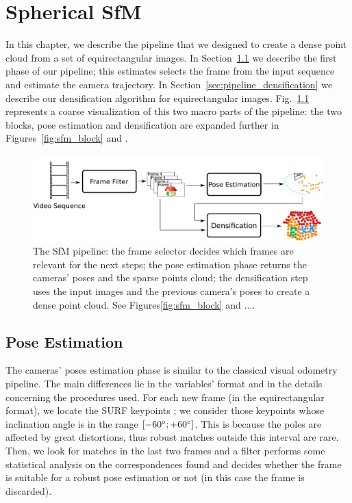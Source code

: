 \chapter{Spherical SfM}
In this chapter, we describe the pipeline that we designed to create a dense 
point cloud from a set of equirectangular images.
In Section~\ref{sec:pipeline_pose_estimation} we describe the first phase of our
pipeline; this estimates selects the frame from the input sequence and estimate
the camera trajectory. In Section~\ref{sec:pipeline_densification} we describe 
our densification algorithm for equirectangular images.
Fig.~\ref{fig:pipeline_overview}
represents a coarse visualization of this two macro parts of the 
pipeline: the two blocks, pose estimation and densification are 
expanded further in Figures~\ref{fig:sfm_block} and .

\begin{figure}
    \centering
    \includegraphics[width=0.8\linewidth]{img/pipeline_overview.pdf}
    \caption{The SfM pipeline: the frame selector decides which frames are 
    relevant for the next steps; the pose estimation phase returns the cameras' 
    poses and the sparse points cloud; the densification step uses 
    the input images and the previous camera's poses to create a dense
    point cloud. See Figures\ref{fig:sfm_block} and ....}
	\label{fig:pipeline_overview}
\end{figure}

\section{Pose Estimation}
\label{sec:pipeline_pose_estimation}
The cameras' poses estimation phase is similar to the classical visual 
odometry pipeline. The main differences lie in the variables' format and in 
the details concerning the procedures used.
For each new frame (in the equirectangular format), we locate the
SURF keypoints \cite{bay2006surf}; we consider those keypoints whose inclination angle is in the range $[-60\degree; +60\degree]$. This is because the poles are affected by great 
distortions, thus robust matches outside this interval are rare.
Then, we look for matches in the last two frames and a filter performs some 
statistical analysis on the correspondences found and decides whether the frame 
is suitable for a robust pose estimation or not (in this case the frame is 
discarded).

